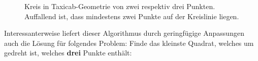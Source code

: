\documentclass{article}
\begin{document}
\begin{figure}[!ht]
  \centering
  \qquad
  \qquad
  \caption{Kreis in Taxicab-Geometrie von zwei respektiv drei Punkten. Auffallend ist, dass mindestens
  zwei Punkte auf der Kreislinie liegen.}
  \label{fig:taxicab_calc}
\end{figure}

Interessanterweise liefert dieser Algorithmus durch geringfügige Anpassungen auch die Lösung für folgendes Problem:
Finde das kleinste Quadrat, welches um \unit[45]{\textdegree} gedreht ist, welches \textbf{drei} Punkte enthält:
\end{document}
